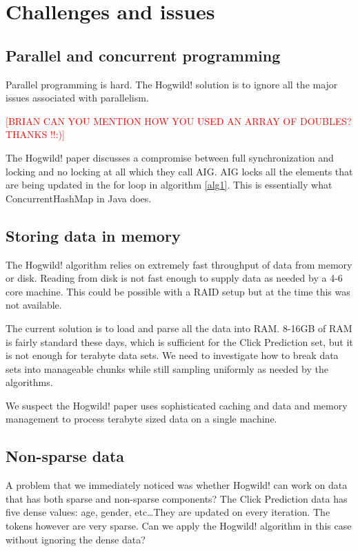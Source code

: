 \documentclass{article} %
\begin{document}
\section{Challenges and issues}
\label{gen_inst}
\subsection{Parallel and concurrent programming}
Parallel programming is hard. The Hogwild! solution is to ignore all the major issues associated with parallelism. 

\textcolor{red}{[BRIAN CAN YOU MENTION HOW YOU USED AN ARRAY OF DOUBLES? THANKS !!:)]}

The Hogwild! paper discusses a compromise between full synchronization and locking and no locking at all which they call AIG. AIG locks all the elements that are being updated in the for loop in algorithm \ref{alg1}. This is essentially what ConcurrentHashMap in Java does.

\subsection{Storing data in memory}
The Hogwild! algorithm relies on extremely fast throughput of data from memory or disk. Reading from disk is not fast enough to supply data as needed by a 4-6 core machine. This could be possible with a RAID setup but at the time this was not available.

The current solution is to load and parse all the data into RAM. 8-16GB of RAM is fairly standard these days, which is sufficient for the Click Prediction set, but it is not enough for terabyte data sets. We need to investigate how to break data sets into manageable chunks while still sampling uniformly as needed by the algorithms.

We suspect the Hogwild! paper uses sophisticated caching and data and memory management to process terabyte sized data on a single machine. 

\subsection{Non-sparse data}
A problem that we immediately noticed was whether Hogwild! can work on data that has both sparse and non-sparse components? The Click Prediction data has five dense values: age, gender, etc\ldots They are updated on every iteration. The tokens however are very sparse. Can we apply the Hogwild! algorithm in this case without ignoring the dense data?
\end{document}
